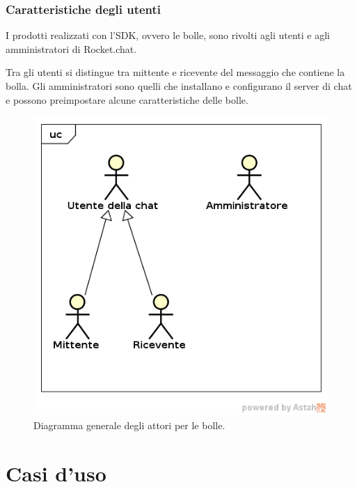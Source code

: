 \subsubsection{Caratteristiche degli utenti}
I prodotti realizzati con l'SDK, ovvero le bolle, sono rivolti agli
utenti e agli amministratori  di Rocket.chat.


Tra gli utenti si distingue tra mittente e ricevente del messaggio che
contiene la bolla. Gli amministratori sono quelli che installano e
configurano il server di chat e possono preimpostare alcune
caratteristiche delle bolle. 



   \FloatBarrier
   \begin{figure}[ht]
   \centering
   \includegraphics[scale=0.45]{img/attori_bolle.png}
   \caption{Diagramma generale degli attori per le bolle.}
\end{figure}




\clearpage
\section{Casi d'uso}

\clearpage








